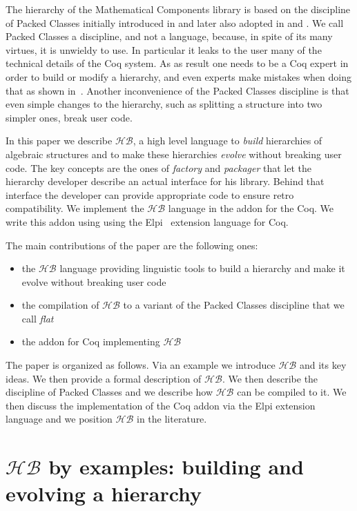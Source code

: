 \documentclass[a4paper,UKenglish,cleveref, autoref]{lipics-v2019}
\newcommand{\HB}{\ensuremath{\mathcal{HB}}}
\newcommand{\hb}{\coq{hierarchy-builder}}
\newcommand{\factory}{factory}
\newcommand{\packager}{packager}
\theoremstyle{implem}
\theoremstyle{implem}
\theoremstyle{axiom}
\theoremstyle{abscommand}
\theoremstyle{command}
\begin{document}
The hierarchy of the Mathematical Components library
is based on the discipline of Packed Classes initially introduced
in \cite{DBLP:conf/itp/GonthierAABCGRMOBPRSTT13} and later also adopted in
\cite{DBLP:conf/mpc/AffeldtNS19} and \cite{DBLP:journals/mics/BoldoLM15}.
We call Packed Classes a discipline, and not a language, because, in spite of
its many virtues, it is unwieldy to use. In particular it leaks to the user
many of the technical details of the Coq system. As as result one
needs to be a Coq expert in order to build or modify a hierarchy, and even
experts make mistakes when doing that as shown in~\cite{KSdraft}.
Another inconvenience of the Packed Classes discipline is that even
simple changes to the hierarchy, such as splitting a structure into
two simpler ones, break user code.

In this paper we describe \HB{}, a high level language
to \emph{build} hierarchies of algebraic structures and to make these hierarchies
\emph{evolve} without breaking user code. The key concepts are the ones of
\emph{\factory{}} and \emph{\packager{}} that let the hierarchy developer describe an actual
interface for his library. Behind that interface the developer can provide
appropriate code to ensure retro compatibility.
We implement the \HB{} language in the \hb{} addon for the Coq.
We write this addon using using the Elpi~\cite{DBLP:conf/lpar/DunchevGCT15,CoqElpi}
extension language for Coq.

The main contributions of the paper are the following ones:
\begin{itemize}
\item the \HB{} language providing linguistic tools to
build a hierarchy and make it evolve without breaking user code
\item the compilation of \HB{} to a variant of the Packed Classes discipline
that we call \emph{flat}
\item the \hb{} addon for Coq implementing \HB{}
\end{itemize}

The paper is organized as follows. Via an example we introduce
\HB{} and its key ideas. We then provide a formal description of
\HB{}. We then describe the discipline
of Packed Classes and we describe how \HB{} can be compiled to it.
We then discuss the implementation of the Coq addon via the Elpi extension
language and we position \HB{} in the literature.

\section{\HB{} by examples: building and evolving a hierarchy}
\label{sec:example}
\end{document}

